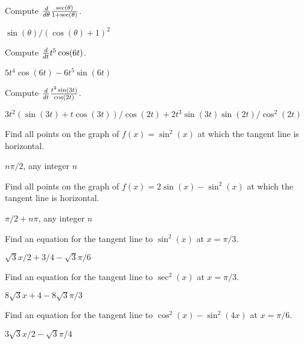 \begin{exercises}
\endtwocol

\begin{exercise} Compute ${d\over d\theta}{\sec(\theta)\over 1+\sec(\theta)}$.
 \begin{answer} $\sin(\theta)/(\cos(\theta)+1)^2$
\end{answer}\end{exercise}

\begin{exercise} Compute ${d\over dt}t^5 \cos (6t)$.
\begin{answer} $5t^4\cos(6t)-6t^5\sin(6t)$
\end{answer}\end{exercise}

\begin{exercise} Compute ${d\over dt}{t^3 \sin (3t)\over\cos (2t)}$.
\begin{answer} $3t^2(\sin(3t)+t\cos(3t))/\cos(2t)+2t^3\sin(3t)\sin(2t)/\cos^2(2t)$
\end{answer}\end{exercise}

\begin{exercise} Find all points on the graph of
$f(x)=\sin^2(x)$ at which the tangent line is horizontal.
\begin{answer} $n\pi/2$, any integer $n$
\end{answer}\end{exercise}

\begin{exercise} Find all points on the graph of $f(x) = 2\sin(x) -
\sin^2(x)$ at which the tangent line is horizontal.
\begin{answer} $\pi/2+n\pi$, any integer $n$
\end{answer}\end{exercise}

\begin{exercise} Find an
 equation for the tangent line to $\sin^2(x)$ at 
$x=\pi/3$.
\begin{answer} $\sqrt3x/2+3/4-\sqrt3\pi/6$
\end{answer}\end{exercise}

\begin{exercise} Find an equation for the tangent line to $\sec^2(x)$
at $x=\pi/3$.
\begin{answer} $8\sqrt3x+4-8\sqrt3\pi/3$
\end{answer}\end{exercise}

\begin{exercise} Find an equation for the tangent line to $\cos^2(x) -
\sin^2(4x)$ at $x=\pi/6$.
\begin{answer} $3\sqrt3x/2-\sqrt3\pi/4$
\end{answer}\end{exercise}


\end{exercises}
